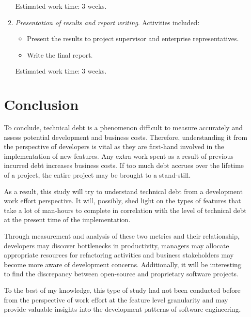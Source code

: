 \documentclass{mprop}
\begin{document}
\begin{enumerate}
	Estimated work time: 3 weeks.\\

	\item \textit{Presentation of results and report writing}.
	Activities included:
\begin{itemize}
	\item Present the results to project supervisor and enterprise
	representatives.
	\item Write the final report.
\end{itemize}
	Estimated work time: 3 weeks.\\

\end{enumerate}

\section{Conclusion}

To conclude, technical debt is a phenomenon difficult to measure accurately and
assess potential development and business costs. Therefore, understanding it
from the perspective of developers is vital as they are first-hand involved in
the implementation of new features. Any extra work spent as a result of previous
incurred debt increases business costs. If too much debt accrues over the
lifetime of a project, the entire project may be brought to a stand-still.

As a result, this study will try to understand technical debt from a development
work effort perspective. It will, possibly, shed light on the types of features
that take a lot of man-hours to complete in correlation with the level of
technical debt at the present time of the implementation. 

Through measurement and analysis of these two metrics and their relationship,
developers may discover bottlenecks in productivity, managers may allocate
appropriate resources for refactoring activities and business stakeholders may
become more aware of development concerns. Additionally, it will be interesting
to find the discrepancy between open-source and proprietary software projects.

To the best of my knowledge, this type of study had not been conducted before
from the perspective of work effort at the feature level granularity and may
provide valuable insights into the development patterns of software engineering.

\pagebreak


\end{document}
